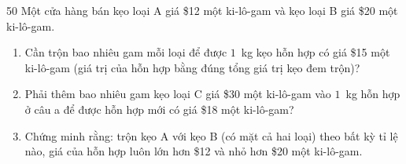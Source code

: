 \begin{probbox}{50}{}
Một cửa hàng bán kẹo loại A giá \$12 một ki-lô-gam và kẹo loại B giá \$20 một ki-lô-gam.
\begin{enumerate}[label=\alph*),leftmargin=1.6em,itemsep=1pt]
\item Cần trộn bao nhiêu gam mỗi loại để được $1$~kg kẹo hỗn hợp có giá \$15 một ki-lô-gam (giá trị của hỗn hợp bằng đúng tổng giá trị kẹo đem trộn)?
\item Phải thêm bao nhiêu gam kẹo loại C giá \$30 một ki-lô-gam vào $1$~kg hỗn hợp ở câu a để được hỗn hợp mới có giá \$18 một ki-lô-gam?
\item Chứng minh rằng: trộn kẹo A với kẹo B (có mặt cả hai loại) theo bất kỳ tỉ lệ nào, giá của hỗn hợp luôn lớn hơn \$12 và nhỏ hơn \$20 một ki-lô-gam.
\end{enumerate}
\end{probbox}
